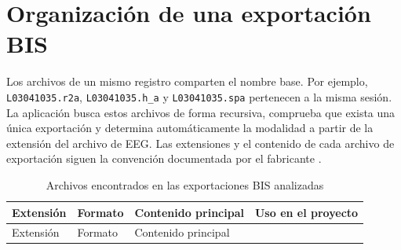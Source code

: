 \documentclass[
  spanish,
  a4paper,
  12pt,
  twoside]{memoir}
\begin{document}
\chapter{Organización de una exportación
BIS}\label{organizaciuxf3n-de-una-exportaciuxf3n-bis}

Los archivos de un mismo registro comparten el nombre base. Por ejemplo,
\texttt{L03041035.r2a}, \texttt{L03041035.h\_a} y \texttt{L03041035.spa}
pertenecen a la misma sesión. La aplicación busca estos archivos de
forma recursiva, comprueba que exista una única exportación y determina
automáticamente la modalidad a partir de la extensión del archivo de
EEG. Las extensiones y el contenido de cada archivo de exportación
siguen la convención documentada por el fabricante
\citep{CovidienBISadvanced}.

\begin{longtable}[]{@{}
  >{\raggedright\arraybackslash}p{}
  >{\raggedright\arraybackslash}p{}
  >{\raggedright\arraybackslash}p{}
  >{\raggedright\arraybackslash}p{}@{}}
\caption{Archivos encontrados en las exportaciones BIS
analizadas}\label{tbl-archivos-bis}\tabularnewline
\toprule\noalign{}
\begin{minipage}[b]{\linewidth}\raggedright
Extensión
\end{minipage} & \begin{minipage}[b]{\linewidth}\raggedright
Formato
\end{minipage} & \begin{minipage}[b]{\linewidth}\raggedright
Contenido principal
\end{minipage} & \begin{minipage}[b]{\linewidth}\raggedright
Uso en el proyecto
\end{minipage} \\
\midrule\noalign{}
\endfirsthead
\toprule\noalign{}
\begin{minipage}[b]{\linewidth}\raggedright
Extensión
\end{minipage} & \begin{minipage}[b]{\linewidth}\raggedright
Formato
\end{minipage} & \begin{minipage}[b]{\linewidth}\raggedright
Contenido principal
\end{minipage} & \begin{minipage}[b]{\linewidth}\raggedright

\end{minipage}
\end{longtable}
\end{document}
